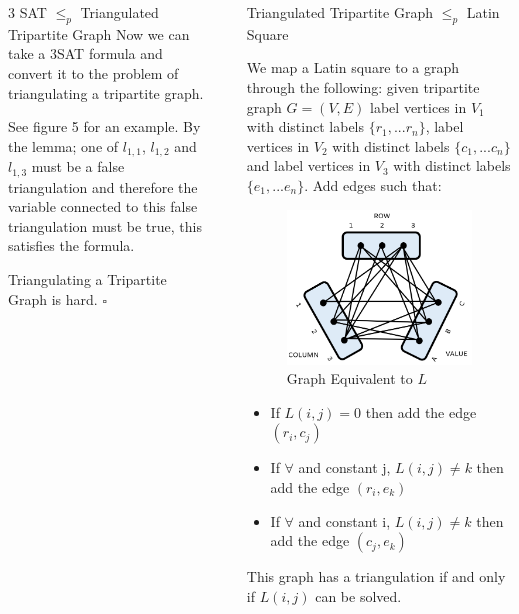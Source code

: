 \documentclass[final]{beamer}
\newlength{\sepwidth}
\newlength{\colwidth}
\newcounter{row}
\newcounter{col}
\newcounter{rowa}
\newcounter{cola}
\newcommand{\separatorcolumn}{\begin{column}{\sepwidth}\end{column}}
\newcommand\setrowa[3]{
  \setcounter{cola}{1}
  \foreach \n in {#1, #2, #3} {
    \edef\x{\value{cola} - 0.5}
    \edef\y{3.5 - \value{rowa}}
    \node[anchor=center] at (\x, \y) {\n};
    \stepcounter{cola}
  }
  \stepcounter{rowa}
}
\begin{document}
\begin{frame}[t]
\begin{columns}[t]
\begin{column}{\colwidth}
\begin{block}{3 SAT $\leq_p$ Triangulated Tripartite Graph \cite{doi:10.1137/0210054}}
Now we can take a 3SAT formula and convert it to the problem of triangulating a tripartite graph.

See figure 5 for an example. By the lemma; one of $l_{1,1}$, $l_{1,2}$ and $l_{1,3}$ must be a false triangulation and therefore the variable connected to this false triangulation must be true, this satisfies the formula.

Triangulating a Tripartite Graph is hard. $\square$
  \end{block}

\end{column}

\separatorcolumn
\begin{column}{\colwidth}
 
  \begin{block}{Triangulated Tripartite Graph $\leq_p$ Latin Square \cite{COLBOURN198425}}

We map a Latin square to a graph through the following: given tripartite graph $G=(V,E)$ label vertices in $V_1$ with distinct labels $\{r_1,...r_n\}$, label vertices in $V_2$ with distinct labels $\{c_1,...c_n\}$ and label vertices in $V_3$ with distinct labels $\{e_1,...e_n\}$. Add edges such that:
\begin{figure}
\end{figure}
\begin{figure}
		\vspace{-50pt}
		\includegraphics[width=50mm]{ttg.png}
		\caption{Graph Equivalent to $L$}
		\vspace{-30pt}
\end{figure}

\begin{itemize}
\item{If $L(i,j) = 0$ then add the edge $(r_i,c_j)$ }
\item{If $\forall$ and constant j, $L(i,j) \neq k$ then add the edge $(r_i,e_k)$}
\item{If $\forall$ and constant i, $L(i,j) \neq k$ then add the edge $(c_j,e_k)$}
\end{itemize}
This graph has a triangulation if and only if $L(i,j)$ can be solved.


\end{block}
\end{column}
\end{columns}
\end{frame}
\end{document}
